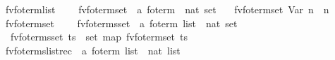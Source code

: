 \begin{isabellebody}
{\isacharbar}{\kern0pt}\ {\isachardoublequoteopen}fv{\isacharunderscore}{\kern0pt}fo{\isacharunderscore}{\kern0pt}term{\isacharunderscore}{\kern0pt}list\ {\isacharunderscore}{\kern0pt}\ {\isacharequal}{\kern0pt}\ {\isacharbrackleft}{\kern0pt}{\isacharbrackright}{\kern0pt}{\isachardoublequoteclose}\isanewline
\isanewline
{}\isamarkupfalse%
\ fv{\isacharunderscore}{\kern0pt}fo{\isacharunderscore}{\kern0pt}term{\isacharunderscore}{\kern0pt}set\ {\isacharcolon}{\kern0pt}{\isacharcolon}{\kern0pt}\ {\isachardoublequoteopen}{\isacharprime}{\kern0pt}a\ fo{\isacharunderscore}{\kern0pt}term\ {\isasymRightarrow}\ nat\ set{\isachardoublequoteclose}\ \isanewline
\ \ {\isachardoublequoteopen}fv{\isacharunderscore}{\kern0pt}fo{\isacharunderscore}{\kern0pt}term{\isacharunderscore}{\kern0pt}set\ {\isacharparenleft}{\kern0pt}Var\ n{\isacharparenright}{\kern0pt}\ {\isacharequal}{\kern0pt}\ {\isacharbraceleft}{\kern0pt}n{\isacharbraceright}{\kern0pt}{\isachardoublequoteclose}\isanewline
{\isacharbar}{\kern0pt}\ {\isachardoublequoteopen}fv{\isacharunderscore}{\kern0pt}fo{\isacharunderscore}{\kern0pt}term{\isacharunderscore}{\kern0pt}set\ {\isacharunderscore}{\kern0pt}\ {\isacharequal}{\kern0pt}\ {\isacharbraceleft}{\kern0pt}{\isacharbraceright}{\kern0pt}{\isachardoublequoteclose}\isanewline
\isanewline
{}\isamarkupfalse%
\ fv{\isacharunderscore}{\kern0pt}fo{\isacharunderscore}{\kern0pt}terms{\isacharunderscore}{\kern0pt}set\ {\isacharcolon}{\kern0pt}{\isacharcolon}{\kern0pt}\ {\isachardoublequoteopen}{\isacharparenleft}{\kern0pt}{\isacharprime}{\kern0pt}a\ fo{\isacharunderscore}{\kern0pt}term{\isacharparenright}{\kern0pt}\ list\ {\isasymRightarrow}\ nat\ set{\isachardoublequoteclose}\ \isanewline
\ \ {\isachardoublequoteopen}fv{\isacharunderscore}{\kern0pt}fo{\isacharunderscore}{\kern0pt}terms{\isacharunderscore}{\kern0pt}set\ ts\ {\isacharequal}{\kern0pt}\ {\isasymUnion}{\isacharparenleft}{\kern0pt}set\ {\isacharparenleft}{\kern0pt}map\ fv{\isacharunderscore}{\kern0pt}fo{\isacharunderscore}{\kern0pt}term{\isacharunderscore}{\kern0pt}set\ ts{\isacharparenright}{\kern0pt}{\isacharparenright}{\kern0pt}{\isachardoublequoteclose}\isanewline
\isanewline
{}\isamarkupfalse%
\ fv{\isacharunderscore}{\kern0pt}fo{\isacharunderscore}{\kern0pt}terms{\isacharunderscore}{\kern0pt}list{\isacharunderscore}{\kern0pt}rec\ {\isacharcolon}{\kern0pt}{\isacharcolon}{\kern0pt}\ {\isachardoublequoteopen}{\isacharparenleft}{\kern0pt}{\isacharprime}{\kern0pt}a\ fo{\isacharunderscore}{\kern0pt}term{\isacharparenright}{\kern0pt}\ list\ {\isasymRightarrow}\ nat\ list{\isachardoublequoteclose}\ \isanewline

\end{isabellebody}
